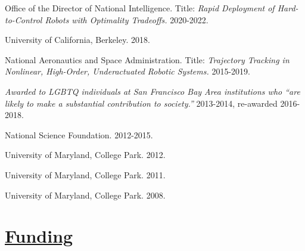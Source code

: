 \documentclass[letterpaper]{deedy-resume} %
\begin{document}
\begin{etaremune}[itemsep=0.05cm]


\item {{} Office of the Director of National Intelligence. Title: {\it Rapid Deployment of Hard-to-Control Robots with Optimality Tradeoffs.} 2020-2022.}

\item {{} University of California, Berkeley. 2018.}

\item {{} National Aeronautics and Space Administration. Title: {\it Trajectory Tracking in Nonlinear, High-Order, Underactuated Robotic Systems.} 2015-2019.}
  
\item {{} {\it Awarded to LGBTQ individuals at San Francisco Bay Area institutions who ``are likely to make a substantial contribution to society.''} 2013-2014, re-awarded 2016-2018.}

\item {{} National Science Foundation. 2012-2015.}

\item {{} University of Maryland, College Park. 2012.}

\item {{} University of Maryland, College Park. 2011.}

\item {{} University of Maryland, College Park. 2008.}

\end{etaremune}


\vspace{0.2cm}
\section{\underline{Funding}}

\vspace{0.1cm}
\end{document}
